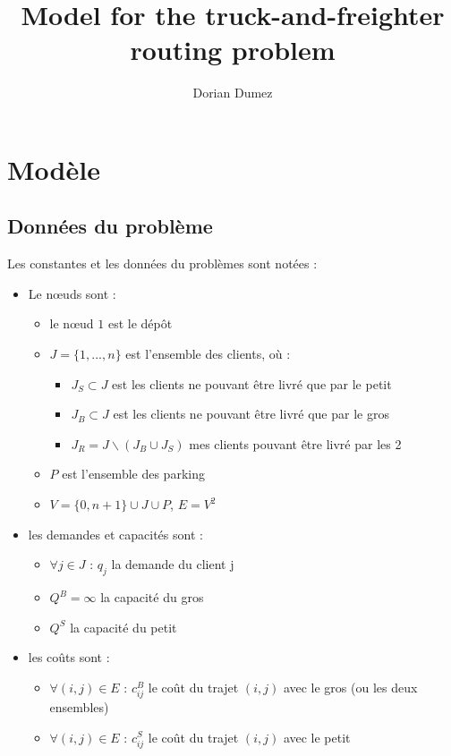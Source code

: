 \documentclass[12pt,a4paper,fleqn]{article}
\title{Model for the truck-and-freighter routing problem}
\author{Dorian Dumez}
\begin{document}
\maketitle


\section{Modèle}

\subsection{Données du problème}

Les constantes et les données du problèmes sont notées :
\begin{itemize}
\item Le nœuds sont :
\begin{itemize}
\item le nœud $1$ est le dépôt 
\item $J = \{1,...,n\}$ est l'ensemble des clients, où :
\begin{itemize}
\item $J_S \subset J$ est les clients ne pouvant être livré que par le petit
\item $J_B \subset J$ est les clients ne pouvant être livré que par le gros
\item $J_R = J \backslash (J_B \cup J_S)$ mes clients pouvant être livré par les 2
\end{itemize}
\item $P$ est l'ensemble des parking
\item $V = \{0, n+1\} \cup J \cup P$, $E = V^2$
\end{itemize}
\item les demandes et capacités sont :
\begin{itemize}
\item $\forall j \in J \text{ : } q_j$ la demande du client j
\item $Q^B = \infty$ la capacité du gros
\item $Q^S$ la capacité du petit
\end{itemize}
\item les coûts sont :
\begin{itemize}
\item $\forall (i,j) \in E \text{ : } c^B_{ij}$ le coût du trajet $(i,j)$ avec le gros (ou les deux ensembles)
\item $\forall (i,j) \in E \text{ : } c^S_{ij}$ le coût du trajet $(i,j)$ avec le petit
\end{itemize} 

\end{itemize}
\end{document}
